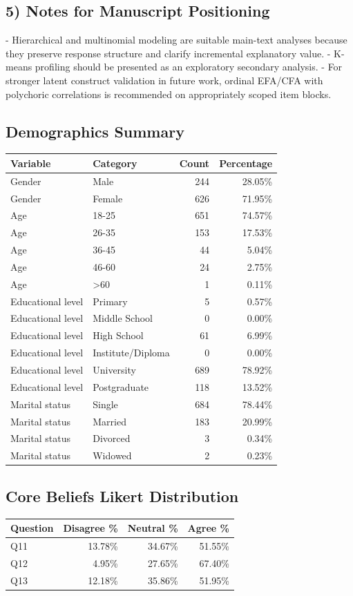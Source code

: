 \documentclass[12pt,a4paper]{article}
\begin{document}
\subsection*{5) Notes for Manuscript Positioning}
- Hierarchical and multinomial modeling are suitable main-text analyses because they preserve response structure and clarify incremental explanatory value. - K-means profiling should be presented as an exploratory secondary analysis. - For stronger latent construct validation in future work, ordinal EFA/CFA with polychoric correlations is recommended on appropriately scoped item blocks.

\newpage
\subsection*{Demographics Summary}
\begin{center}
\small
\begin{tabular}{llrr}
\hline
\textbf{Variable} & \textbf{Category} & \textbf{Count} & \textbf{Percentage} \\
\hline
Gender & Male & 244 & 28.05\% \\
Gender & Female & 626 & 71.95\% \\
Age & 18-25 & 651 & 74.57\% \\
Age & 26-35 & 153 & 17.53\% \\
Age & 36-45 & 44 & 5.04\% \\
Age & 46-60 & 24 & 2.75\% \\
Age & >60 & 1 & 0.11\% \\
Educational level & Primary & 5 & 0.57\% \\
Educational level & Middle School & 0 & 0.00\% \\
Educational level & High School & 61 & 6.99\% \\
Educational level & Institute/Diploma & 0 & 0.00\% \\
Educational level & University & 689 & 78.92\% \\
Educational level & Postgraduate & 118 & 13.52\% \\
Marital status & Single & 684 & 78.44\% \\
Marital status & Married & 183 & 20.99\% \\
Marital status & Divorced & 3 & 0.34\% \\
Marital status & Widowed & 2 & 0.23\% \\
\hline
\end{tabular}
\end{center}
\subsection*{Core Beliefs Likert Distribution}
\begin{center}
\small
\begin{tabular}{lrrr}
\hline
\textbf{Question} & \textbf{Disagree \%} & \textbf{Neutral \%} & \textbf{Agree \%} \\
\hline
Q11 & 13.78\% & 34.67\% & 51.55\% \\
Q12 & 4.95\% & 27.65\% & 67.40\% \\
Q13 & 12.18\% & 35.86\% & 51.95\% \\
\hline
\end{tabular}
\end{center}
\end{document}
